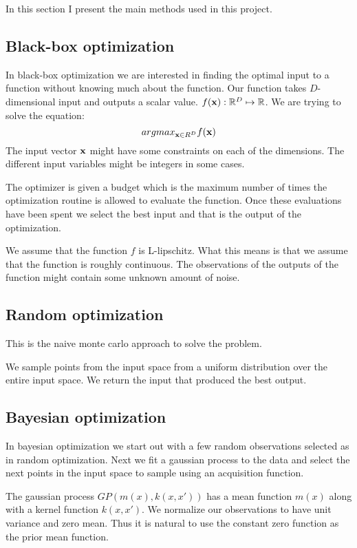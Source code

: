 
In this section I present the main methods used in this project.

\subsection{Black-box optimization}

In black-box optimization we are interested in finding the optimal input to a function without knowing much about the function. Our function takes $D$-dimensional input and outputs a scalar value. $f(\mathbf{x}): \mathbb{R}^D \mapsto \mathbb{R}$. We are trying to solve the equation: \[
    argmax_{\mathbf{x} \in R^D} f(\mathbf{x})
    \]
The input vector $\mathbf{x}$ might have some constraints on each of the dimensions. The different input variables might be integers in some cases.

The optimizer is given a budget which is the maximum number of times the optimization routine is allowed to evaluate the function. Once these evaluations have been spent we select the best input and that is the output of the optimization.

We assume that the function $f$ is L-lipschitz. What this means is that we assume that the function is roughly continuous. The observations of the outputs of the function might contain some unknown amount of noise.

\subsection{Random optimization}

This is the naive monte carlo approach to solve the problem.

We sample points from the input space from a uniform distribution over the entire input space. We return the input that produced the best output.

\subsection{Bayesian optimization}

In bayesian optimization we start out with a few random observations selected as in random optimization. Next we fit a gaussian process to the data and select the next points in the input space to sample using an acquisition function.

The gaussian process $GP(m(x), k(x, x'))$ has a mean function $m(x)$ along with a kernel function $k(x, x')$. We normalize our observations to have unit variance and zero mean. Thus it is natural to use the constant zero function as the prior mean function.

